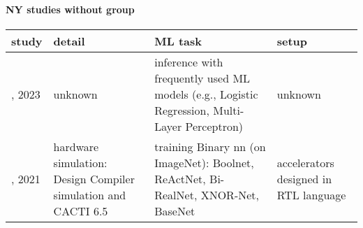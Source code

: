 \paragraph{NY studies without group} 
 \label{tab:NY-other} 
\begin{longtable}{|>{\raggedright\arraybackslash}p{0.85cm}|p{4cm}|p{6cm}|>{\raggedright\arraybackslash}p{3.75cm}|}
\toprule
\bfseries study & \bfseries detail & \bfseries ML task & \bfseries setup \\
\midrule 
\endhead
\cite{islam2023}, 2023 & unknown & inference with frequently used ML models (e.g., Logistic Regression, Multi-Layer Perceptron) & unknown \\
\cite{guo2021}, 2021 & hardware simulation: Design Compiler simulation and CACTI 6.5 & training Binary \acrshort{nn} (on ImageNet): Boolnet, ReActNet, Bi-RealNet, XNOR-Net, BaseNet & 5 accelerators designed in RTL language \\
\bottomrule
\end{longtable}
